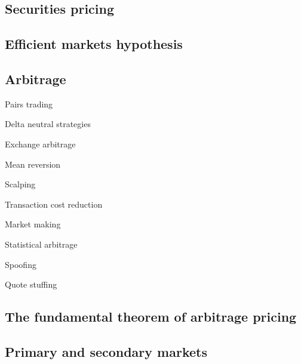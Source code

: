 
\subsection{Securities pricing}

\subsection{Efficient markets hypothesis}


\subsection{Arbitrage}

Pairs trading

Delta neutral strategies

Exchange arbitrage

Mean reversion

Scalping

Transaction cost reduction

Market making

Statistical arbitrage

Spoofing

Quote stuffing


\subsection{The fundamental theorem of arbitrage pricing}


\subsection{Primary and secondary markets}


